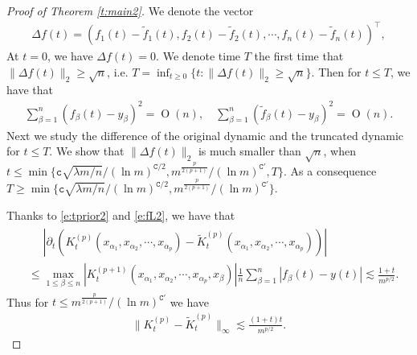 \documentclass{article}
\numberwithin{equation}{section}
\newcommand{\fc}{{\mathtt c}}
\newcommand{\fC}{{\mathtt C}}
\newcommand{\al}{\alpha}
\newcommand{\la}{\lambda}
\DeclareMathOperator{\OO}{O}
\renewcommand{\leq}{\leqslant}
\renewcommand{\geq}{\geqslant}
\newcommand{\del}{\partial}
\newcommand{\1}{\mathds{1}}
\theoremstyle{plain} %
\begin{document}
\begin{proof}[Proof of Theorem \ref{t:main2}]
%

We denote the vector
\begin{align*}
\Delta f(t)=(f_1(t)-\tilde f_1(t), f_2(t)-\tilde f_2(t),\cdots,f_n(t)-\tilde f_n(t))^\top,
\end{align*}
At $t=0$, we have $\Delta f(t)=0$. We denote time $T$ the first time that $\|\Delta f(t)\|_2\geq \sqrt n$, i.e. $T=\inf_{t\geq 0}\{t: \|\Delta f(t)\|_2\geq \sqrt n\}$.
Then for $t\leq T$, we have that 
\begin{align*}
\sum_{\beta=1}^n ( f_\beta(t)-y_\beta)^2=\OO(n),\quad \sum_{\beta=1}^n (\tilde f_\beta(t)-y_\beta)^2=\OO(n).
\end{align*}
Next we study the difference of the original dynamic and the truncated dynamic for $t\leq T$. We show that $\|\Delta f(t)\|_2$ is much smaller than $\sqrt n$, when $t\leq \min\{\fc \sqrt{\la m/n}/(\ln m)^{\fC/2}, m^{\frac{p}{2(p+1)}}/(\ln m)^{\fC'}, T\}$. As a consequence $T\geq \min\{\fc \sqrt{\la m/n}/(\ln m)^{\fC/2}, m^{\frac{p}{2(p+1)}}/(\ln m)^{\fC'}\}$.

Thanks to \eqref{e:tprior2} and \eqref{e:fL2}, we have that
\begin{align*}\begin{split}
&\phantom{{}={}}\left|\del_t (K_t^{(p)}(x_{\al_1}, x_{\al_2}, \cdots, x_{\al_p})-\tilde K_t^{(p)}(x_{\al_1}, x_{\al_2}, \cdots, x_{\al_p}))\right|\\
&\leq \max_{1\leq \beta\leq n} |K_t^{(p+1)}(x_{\al_1}, x_{\al_2},\cdots, x_{\al_p},x_{\beta})|\frac{1}{n}\sum_{\beta=1}^n |f_\beta(t)-y(t)|
\lesssim \frac{1+t}{m^{p/2}}.
\end{split}\end{align*}
Thus for $t\leq m^{\frac{p}{2(p+1)}}/(\ln m)^{\fC'}$ we have
\begin{align*}
\|K_t^{(p)}-\tilde K_t^{(p)}\|_\infty\lesssim \frac{(1+t)t}{m^{p/2}}.
\end{align*}


\end{proof}
\end{document}
